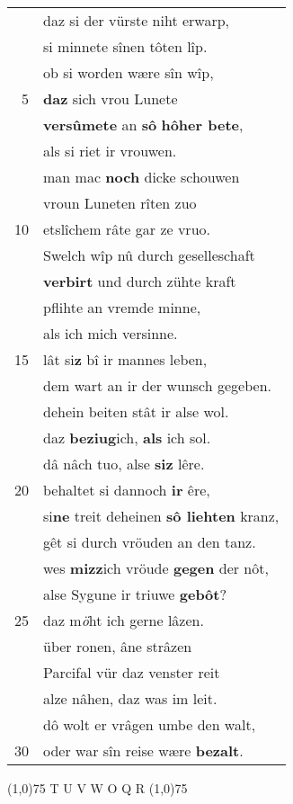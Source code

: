 \documentclass[8pt,a4paper,notitlepage]{article}
\begin{document}
\begin{table}[ht]
\begin{minipage}[t]{0.5\linewidth}
\begin{tabular}{rl}
 & daz si der vürste niht erwarp,\\ 
 & si minnete sînen tôten lîp.\\ 
 & ob si worden wære sîn wîp,\\ 
5 & \textbf{daz} sich vrou Lunete\\ 
 & \textbf{versûmete} an \textbf{sô} \textbf{hôher bete},\\ 
 & als si riet ir vrouwen.\\ 
 & man mac \textbf{noch} dicke schouwen\\ 
 & vroun Luneten rîten zuo\\ 
10 & etslîchem râte gar ze vruo.\\ 
 & Swelch wîp nû durch geselleschaft\\ 
 & \textbf{verbirt} und durch zühte kraft\\ 
 & pflihte an vremde minne,\\ 
 & als ich mich versinne.\\ 
15 & lât si\textbf{z} bî ir mannes leben,\\ 
 & dem wart an ir der wunsch gegeben.\\ 
 & dehein beiten stât ir alse wol.\\ 
 & daz \textbf{beziug}ich, \textbf{als} ich sol.\\ 
 & dâ nâch tuo, alse \textbf{siz} lêre.\\ 
20 & behaltet si dannoch \textbf{ir} êre,\\ 
 & si\textbf{ne} treit deheinen \textbf{sô liehten} kranz,\\ 
 & gêt si durch vröuden an den tanz.\\ 
 & wes \textbf{mizz}ich vröude \textbf{gegen} der nôt,\\ 
 & alse Sygune ir triuwe \textbf{gebôt}?\\ 
25 & daz m\textit{ö}ht ich gerne lâzen.\\ 
 & über ronen, âne strâzen\\ 
 & Parcifal vür daz venster reit\\ 
 & alze nâhen, daz was im leit.\\ 
 & dô wolt er vrâgen umbe den walt,\\ 
30 & oder war sîn reise wære \textbf{bezalt}.\\ 
\end{tabular}
\scriptsize
\line(1,0){75} \newline
T U V W O Q R \newline
\line(1,0){75} \newline

\end{minipage}
\end{table}
\end{document}
